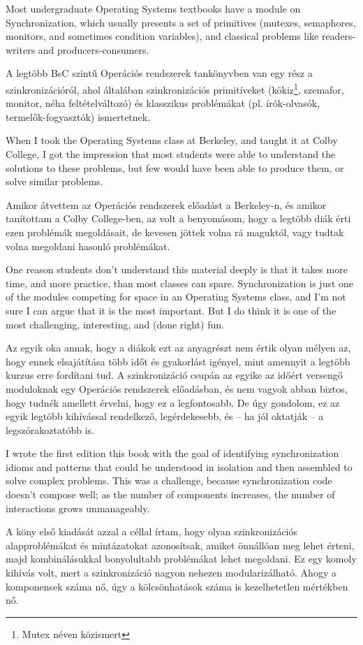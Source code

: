\documentclass{book}
\begin{document}
Most undergraduate Operating Systems textbooks have a module on
Synchronization, which usually presents a set of primitives
(mutexes, semaphores, monitors, and sometimes condition variables),
and classical problems like readers-writers and
producers-consumers.

A legtöbb BsC szintű Operációs rendszerek tankönyvben van egy rész
a szinkronizációról, ahol általában szinkronizációs primitíveket
(kökiz\footnote{Mutex néven közismert}, szemafor, monitor, néha feltételváltozó) és klasszikus
problémákat (pl. írók-olvasók, termelők-fogyasztók)
ismertetnek.

When I took the Operating Systems class at Berkeley, and taught it at
Colby College, I got the impression that most students were able to
understand the solutions to these problems, but few would have been
able to produce them, or solve similar problems.

Amikor átvettem az Operációs rendszerek előadást a Berkeley-n, és amikor
tanítottam a Colby College-ben, az volt a benyomásom, hogy a legtöbb
diák érti ezen problémák megoldásait, de kevesen jöttek volna rá
maguktól, vagy tudtak volna megoldani hasonló problémákat.

One reason students don't understand this material deeply is that
it takes more time, and more practice, than most classes can spare.
Synchronization is just one of the modules competing for space in
an Operating Systems class, and I'm not sure I can argue that it is
the most important.  But I do think it is one of the most challenging,
interesting, and (done right) fun.

Az egyik oka annak, hogy a diákok ezt az anyagrészt nem értik
olyan mélyen az, hogy ennek elsajátítása több időt és gyakorlást igényel, mint
amennyit a legtöbb kurzus erre fordítani tud. A szinkronizáció
csupán az egyike az időért versengő moduloknak egy Operációs rendszerek
előadásban, és nem vagyok abban biztos, hogy tudnék amellett érvelni, hogy
ez a legfontosabb. De úgy gondolom, ez az egyik legtöbb kihívással rendelkező,
legérdekesebb, és -- ha jól oktatják -- a legszórakoztatóbb is.
 
I wrote the first edition this book with the goal of identifying
synchronization idioms and patterns that could be 
understood in isolation and then assembled to solve complex problems.
This was a challenge, because synchronization code doesn't compose
well; as the number of components increases, the number of interactions
grows unmanageably.

A köny első kiadását azzal a céllal írtam, hogy olyan szinkronizációs
alapproblémákat és mintázatokat azonosítsak, amiket önnállóan meg
lehet érteni, majd kombinálásukkal bonyolultabb problémákat lehet
megoldani. Ez egy komoly kihívás volt, mert a szinkronizáció
nagyon nehezen modularizálható. Ahogy a komponensek száma nő, úgy
a kölcsönhatások száma is kezelhetetlen mértékben nő.
\end{document}
